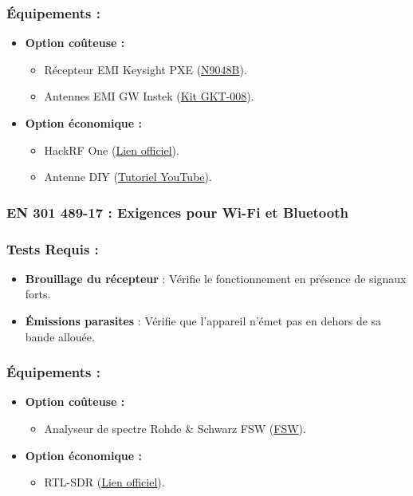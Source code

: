 \documentclass[a4paper,12pt]{article}
\begin{document}
\subsubsection*{Équipements :}
\begin{itemize}
    \item \textbf{Option coûteuse :}
          \begin{itemize}
              \item Récepteur EMI Keysight PXE (\href{https://www.keysight.com/us/en/product/N9048B/pxe-emi-receiver-1-hz-44-ghz.html}{N9048B}).
              \item Antennes EMI GW Instek (\href{https://eleshop.fr/gw-instek-gkt-008-emi-probe-kit.html}{Kit GKT-008}).
          \end{itemize}
    \item \textbf{Option économique :}
          \begin{itemize}
              \item HackRF One (\href{https://greatscottgadgets.com/hackrf/one/}{Lien officiel}).
              \item Antenne DIY (\href{https://www.youtube.com/watch?v=2xy3Hm1_ZqI}{Tutoriel YouTube}).
          \end{itemize}
\end{itemize}

\subsubsection{EN 301 489-17 : Exigences pour Wi-Fi et Bluetooth}
\subsubsection*{Tests Requis :}
\begin{itemize}
    \item \textbf{Brouillage du récepteur} : Vérifie le fonctionnement en présence de signaux forts.
    \item \textbf{Émissions parasites} : Vérifie que l’appareil n’émet pas en dehors de sa bande allouée.
\end{itemize}

\subsubsection*{Équipements :}
\begin{itemize}
    \item \textbf{Option coûteuse :}
          \begin{itemize}
              \item Analyseur de spectre Rohde \& Schwarz FSW (\href{https://www.rohde-schwarz.com/product/FSW.html}{FSW}).
          \end{itemize}
    \item \textbf{Option économique :}
          \begin{itemize}
              \item RTL-SDR (\href{https://www.rtl-sdr.com/}{Lien officiel}).
          \end{itemize}
\end{itemize}
\end{document}
